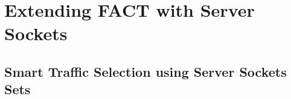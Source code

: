 
\chapter{Extending FACT with Server Sockets\label{chapter:integration}}

\section{Smart Traffic Selection using Server Sockets Sets\label{section:ses_selection}}


